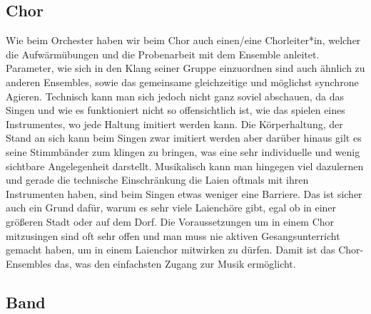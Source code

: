 \subsection{Chor}

Wie beim Orchester haben wir beim Chor auch einen/eine Chorleiter*in, welcher
die Aufwärmübungen und die Probenarbeit mit dem Ensemble anleitet. Parameter,
wie sich in den Klang seiner Gruppe einzuordnen sind auch ähnlich zu anderen
Ensembles, sowie das gemeinsame gleichzeitige und möglichst synchrone Agieren.
Technisch kann man sich jedoch nicht ganz soviel abschauen, da das Singen und
wie es funktioniert nicht so offensichtlich ist, wie das spielen eines
Instrumentes, wo jede Haltung imitiert werden kann. Die Körperhaltung, der Stand
an sich kann beim Singen zwar imitiert werden aber darüber hinaus gilt es seine
Stimmbänder zum klingen zu bringen, was eine sehr individuelle und wenig
sichtbare Angelegenheit darstellt. Musikalisch kann man hingegen viel dazulernen
und gerade die technische Einschränkung die Laien oftmals mit ihren Instrumenten
haben, sind beim Singen etwas weniger eine Barriere. Das ist sicher auch ein
Grund dafür, warum es sehr viele Laienchöre gibt, egal ob in einer größeren
Stadt oder auf dem Dorf. Die Voraussetzungen um in einem Chor mitzusingen sind
oft sehr offen und man muss nie aktiven Gesangsunterricht gemacht haben, um in
einem Laienchor mitwirken zu dürfen. Damit ist das Chor-Ensembles das, was den
einfachsten Zugang zur Musik ermöglicht. 



\subsection{Band}

